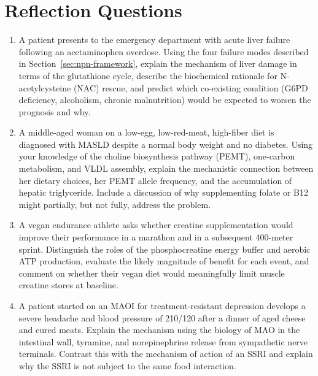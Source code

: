 \documentclass{tufte-handout}
\begin{document}
\section{Reflection Questions}
\begin{enumerate}
\item A patient presents to the emergency department with acute liver failure following an acetaminophen overdose. Using the four failure modes described in Section~\ref{sec:npn-framework}, explain the mechanism of liver damage in terms of the glutathione cycle, describe the biochemical rationale for N-acetylcysteine (NAC) rescue, and predict which co-existing condition (G6PD deficiency, alcoholism, chronic malnutrition) would be expected to worsen the prognosis and why.
\item A middle-aged woman on a low-egg, low-red-meat, high-fiber diet is diagnosed with MASLD despite a normal body weight and no diabetes. Using your knowledge of the choline biosynthesis pathway (PEMT), one-carbon metabolism, and VLDL assembly, explain the mechanistic connection between her dietary choices, her PEMT allele frequency, and the accumulation of hepatic triglyceride. Include a discussion of why supplementing folate or B12 might partially, but not fully, address the problem.
\item A vegan endurance athlete asks whether creatine supplementation would improve their performance in a marathon and in a subsequent 400-meter sprint. Distinguish the roles of the phosphocreatine energy buffer and aerobic ATP production, evaluate the likely magnitude of benefit for each event, and comment on whether their vegan diet would meaningfully limit muscle creatine stores at baseline.
\item A patient started on an MAOI for treatment-resistant depression develops a severe headache and blood pressure of 210/120 after a dinner of aged cheese and cured meats. Explain the mechanism using the biology of MAO in the intestinal wall, tyramine, and norepinephrine release from sympathetic nerve terminals. Contrast this with the mechanism of action of an SSRI and explain why the SSRI is not subject to the same food interaction.
\end{enumerate}
\end{document}
